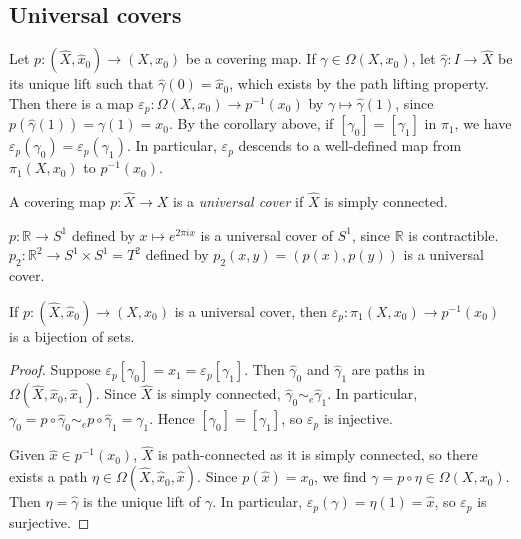 \subsection{Universal covers}
Let \( p \colon (\hat X, \hat x_0) \to (X, x_0) \) be a covering map.
If \( \gamma \in \Omega(X,x_0) \), let \( \hat \gamma \colon I \to \hat X \) be its unique lift such that \( \hat \gamma(0) = \hat x_0 \), which exists by the path lifting property.
Then there is a map \( \varepsilon_p \colon \Omega(X,x_0) \to p^{-1}(x_0) \) by \( \gamma \mapsto \hat\gamma(1) \), since \( p(\hat\gamma(1)) = \gamma(1) = x_0 \).
By the corollary above, if \( [\gamma_0] = [\gamma_1] \) in \( \pi_1 \), we have \( \varepsilon_p(\gamma_0) = \varepsilon_p(\gamma_1) \).
In particular, \( \varepsilon_p \) descends to a well-defined map from \( \pi_1(X,x_0) \) to \( p^{-1}(x_0) \).
\begin{definition}
	A covering map \( p \colon \hat X \to X \) is a \emph{universal cover} if \( \hat X \) is simply connected.
\end{definition}
\begin{example}
	\( p \colon \mathbb R \to S^1 \) defined by \( x \mapsto e^{2 \pi i x} \) is a universal cover of \( S^1 \), since \( \mathbb R \) is contractible.
	\( p_2 \colon \mathbb R^2 \to S^1 \times S^1 = T^2 \) defined by \( p_2(x,y) = (p(x),p(y)) \) is a universal cover.
\end{example}
\begin{proposition}
	If \( p \colon (\hat X, \hat x_0) \to (X, x_0) \) is a universal cover, then \( \varepsilon_p \colon \pi_1(X,x_0) \to p^{-1}(x_0) \) is a bijection of sets.
\end{proposition}
\begin{proof}
	Suppose \( \varepsilon_p[\gamma_0] = \hat x_1 = \varepsilon_p[\gamma_1] \).
	Then \( \hat \gamma_0 \) and \( \hat \gamma_1 \) are paths in \( \Omega(\hat X, \hat x_0, \hat x_1) \).
	Since \( \hat X \) is simply connected, \( \hat \gamma_0 \sim_e \hat \gamma_1 \).
	In particular, \( \gamma_0 = p \circ \hat \gamma_0 \sim_e p \circ \hat \gamma_1 = \gamma_1 \).
	Hence \( [\gamma_0] = [\gamma_1] \), so \( \varepsilon_p \) is injective.

	Given \( \hat x \in p^{-1}(x_0) \), \( \hat X \) is path-connected as it is simply connected, so there exists a path \( \eta \in \Omega(\hat X, \hat x_0, \hat x) \).
	Since \( p(\hat x) = x_0 \), we find \( \gamma = p \circ \eta \in \Omega(X,x_0) \).
	Then \( \eta = \hat\gamma \) is the unique lift of \( \gamma \).
	In particular, \( \varepsilon_p(\gamma) = \eta(1) = \hat x \), so \( \varepsilon_p \) is surjective.
\end{proof}
